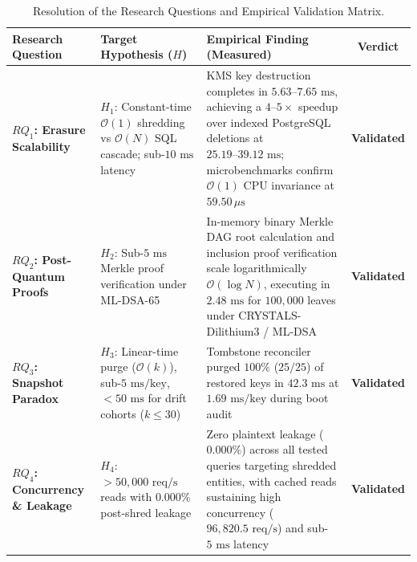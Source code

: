 \begin{table}[H]
  \centering
  \caption{Resolution of the Research Questions and Empirical Validation Matrix.}
  \label{tab:rq-resolution-matrix}
  \begin{tabular}{p{3.2cm} p{3.8cm} p{6.0cm} c}
    \toprule
    \textbf{Research Question} & \textbf{Target Hypothesis ($H$)} & \textbf{Empirical Finding (Measured)} & \textbf{Verdict} \\
    \midrule
    \textbf{$RQ_1$: Erasure Scalability} & 
    $H_1$: Constant-time $\mathcal{O}(1)$ shredding vs $\mathcal{O}(N)$ SQL cascade; sub-$10\text{~ms}$ latency & 
    KMS key destruction completes in $5.63\text{--}7.65\text{~ms}$, achieving a $4\text{--}5\times$ speedup over indexed PostgreSQL deletions at $25.19\text{--}39.12\text{~ms}$; microbenchmarks confirm $\mathcal{O}(1)$ CPU invariance at $59.50\,\mu\text{s}$ & 
    \textbf{Validated} \\
    \addlinespace[0.6em]
    \textbf{$RQ_2$: Post-Quantum Proofs} & 
    $H_2$: Sub-$5\text{~ms}$ Merkle proof verification under ML-DSA-65 & 
    In-memory binary Merkle DAG root calculation and inclusion proof verification scale logarithmically $\mathcal{O}(\log N)$, executing in $2.48\text{~ms}$ for $100{,}000$ leaves under CRYSTALS-Dilithium3 / ML-DSA & 
    \textbf{Validated} \\
    \addlinespace[0.6em]
    \textbf{$RQ_3$: Snapshot Paradox} & 
    $H_3$: Linear-time purge ($\mathcal{O}(k)$), sub-$5\text{~ms/key}$, $<50\text{~ms}$ for drift cohorts ($k \le 30$) & 
    Tombstone reconciler purged $100\%$ ($25/25$) of restored keys in $42.3\text{~ms}$ at $1.69\text{~ms/key}$ during boot audit & 
    \textbf{Validated} \\
    \addlinespace[0.6em]
    \textbf{$RQ_4$: Concurrency \& Leakage} & 
    $H_4$: $>50{,}000\text{~req/s}$ reads with $0.000\%$ post-shred leakage & 
    Zero plaintext leakage ($0.000\%$) across all tested queries targeting shredded entities, with cached reads sustaining high concurrency ($96{,}820.5\text{~req/s}$) and sub-$5\text{~ms}$ latency & 
    \textbf{Validated} \\
    \bottomrule
  \end{tabular}
\end{table}

